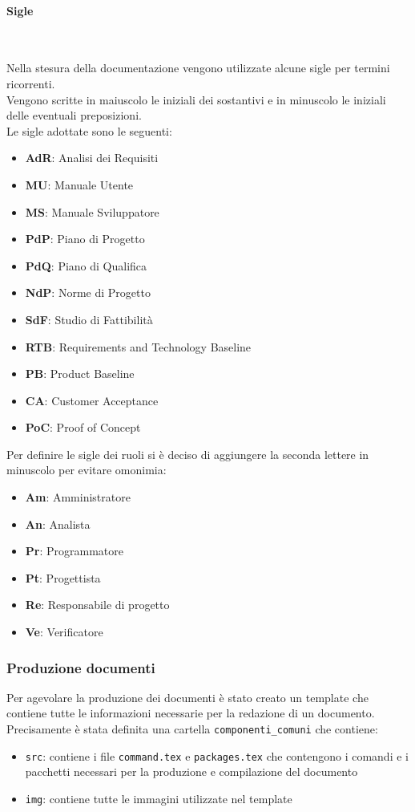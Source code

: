 \paragraph{Sigle} ~

Nella stesura della documentazione vengono utilizzate alcune sigle per termini ricorrenti. \\
Vengono scritte in maiuscolo le iniziali dei sostantivi e in minuscolo le iniziali delle eventuali preposizioni. \\
Le sigle adottate sono le seguenti:
\begin{itemize}
    \item \textbf{AdR}: Analisi dei Requisiti
    \item \textbf{MU}: Manuale Utente
    \item \textbf{MS}: Manuale Sviluppatore
    \item \textbf{PdP}: Piano di Progetto
    \item \textbf{PdQ}: Piano di Qualifica
    \item \textbf{NdP}: Norme di Progetto
    \item \textbf{SdF}: Studio di Fattibilità
    \item \textbf{RTB}: Requirements and Technology Baseline
    \item \textbf{PB}: Product Baseline
    \item \textbf{CA}: Customer Acceptance
    \item \textbf{PoC}: Proof of Concept
\end{itemize}

Per definire le sigle dei ruoli si è deciso di aggiungere la seconda lettere in minuscolo per evitare omonimia:
\begin{itemize}
    \item \textbf{Am}: Amministratore
    \item \textbf{An}: Analista
    \item \textbf{Pr}: Programmatore
    \item \textbf{Pt}: Progettista
    \item \textbf{Re}: Responsabile di progetto
    \item \textbf{Ve}: Verificatore
\end{itemize}

\subsubsection{Produzione documenti}
Per agevolare la produzione dei documenti è stato creato un template che contiene tutte le informazioni necessarie per la redazione di un documento.\\
Precisamente è stata definita una cartella \texttt{componenti\_comuni} che contiene:
\begin{itemize}
    \item \texttt{src}: contiene i file \texttt{command.tex} e \texttt{packages.tex} che contengono i comandi e i pacchetti necessari per la produzione e compilazione del documento
    \item \texttt{img}: contiene tutte le immagini utilizzate nel template
\end{itemize}

